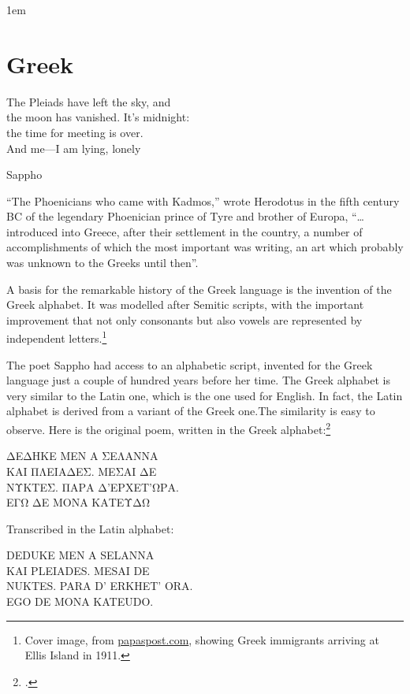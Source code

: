
\parindent1em

\chapter{Greek}
\epigraph{The Pleiads have left the sky, and\\
the moon has vanished. It’s midnight:\\
the time for meeting is over.\\
And me—I am lying, lonely}{Sappho}
\label{s:greek}



\enquote{The Phoenicians who came with Kadmos,} wrote Herodotus in the fifth century BC of the legendary Phoenician prince of Tyre and brother of Europa, ``\ldots introduced into Greece, after their settlement in the country, a number of accomplishments of which the most important was writing, an art which probably was unknown to the Greeks until then''. 

A basis for the remarkable history of the Greek language is the invention of the Greek alphabet. It was modelled after Semitic scripts, with the important improvement that not only consonants but also vowels are represented by independent
letters.\footnote{Cover image, from \href{http://www.pappaspost.com/todays-undesirable-muslims-were-yesteryears-greeks-pure-american-no-rats-no-greeks/}{papaspost.com}, showing Greek immigrants arriving at Ellis Island in 1911.}

The poet Sappho had access to an alphabetic script, invented
for the Greek language just a couple of hundred years before her
time. The Greek alphabet is very similar to the Latin one, which
is the one used for English. In fact, the Latin alphabet is derived
from a variant of the Greek one.The similarity is easy to observe.
Here is the original poem, written in the Greek alphabet:\footcite{janson:2002}


\begin{center}
\arial 
ΔΕΔΗΚΕ ΜΕΝ Α ΣΕΛΑΝΝΑ\\
ΚΑΙ ΠΛΕΙΑΔΕΣ. ΜΕΣΑΙ ΔΕ\\
ΝΥΚΤΕΣ. ΠΑΡΑ Δ'ΕΡΧΕΤ'ΩΡΑ.\\
ΕΓΩ ΔΕ ΜΟΝΑ ΚΑΤΕΥΔΩ\\
\end{center} 

Transcribed in the Latin alphabet:

\begin{center}
DEDUKE MEN A SELANNA\\
KAI PLEIADES. MESAI DE\\
NUKTES. PARA D’ ERKHET’ ORA.\\
EGO DE MONA KATEUDO.\\
\end{center}

